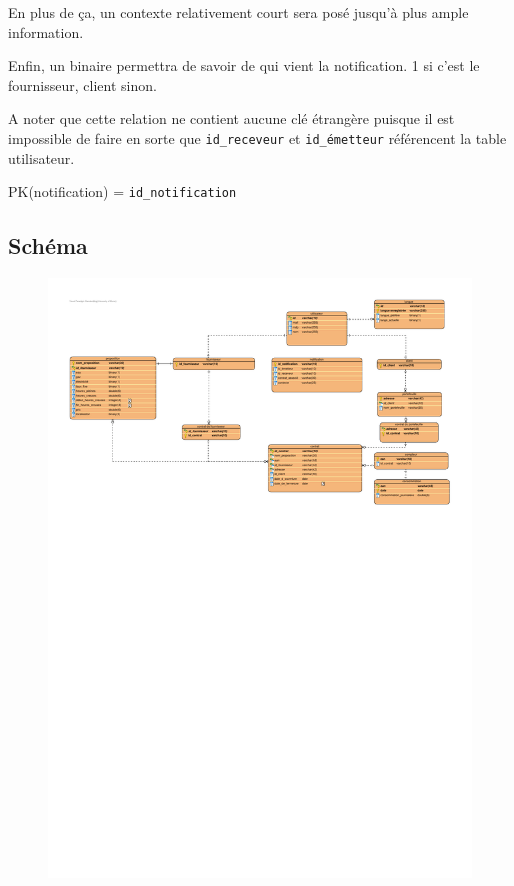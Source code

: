 \begin{flushleft}
En plus de ça, un contexte relativement court sera posé jusqu'à plus ample information.
\end{flushleft}

\begin{flushleft}
Enfin, un binaire permettra de savoir de qui vient la notification. 1 si c'est le fournisseur, client sinon.
\end{flushleft}

\begin{flushleft}
A noter que cette relation ne contient aucune clé étrangère puisque il est impossible de faire en sorte que \texttt{id\_receveur} et \texttt{id\_émetteur} référencent la table utilisateur.
\end{flushleft}
\begin{flushleft}
PK(notification) = \texttt{id\_notification}
\end{flushleft}

\newpage

\subsection{Schéma}
\begin{figure}[h]
\includegraphics[scale=0.5]{Base/bdd/img/bdd.pdf}
\end{figure}
